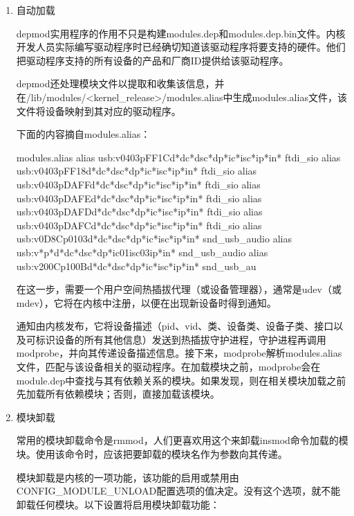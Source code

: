 \documentclass[lang=cn,newtx,10pt,scheme=chinese]{elegantbook}
\begin{document}
\begin{enumerate}
    下面是一个文件中的内容：

    \begin{mycode}{配置文件示例}
        #this line is a comment
        uio
        iwlwifi
    \end{mycode}

    \item 自动加载
    
    depmod实用程序的作用不只是构建modules.dep和modules.dep.bin文件。内核开发人员实际编写驱动程序时已经确切知道该驱动程序将要支持的硬件。他们把驱动程序支持的所有设备的产品和厂商ID提供给该驱动程序。
    
    depmod还处理模块文件以提取和收集该信息，并在/lib/modules/<kernel\_release>/modules.alias中生成modules.alias文件，该文件将设备映射到其对应的驱动程序。

    下面的内容摘自modules.alias：

    \begin{mycode}{modules.alias}
        alias usb:v0403pFF1Cd*dc*dsc*dp*ic*isc*ip*in* ftdi_sio
        alias usb:v0403pFF18d*dc*dsc*dp*ic*isc*ip*in* ftdi_sio
        alias usb:v0403pDAFFd*dc*dsc*dp*ic*isc*ip*in* ftdi_sio
        alias usb:v0403pDAFEd*dc*dsc*dp*ic*isc*ip*in* ftdi_sio
        alias usb:v0403pDAFDd*dc*dsc*dp*ic*isc*ip*in* ftdi_sio
        alias usb:v0403pDAFCd*dc*dsc*dp*ic*isc*ip*in* ftdi_sio
        alias usb:v0D8Cp0103d*dc*dsc*dp*ic*isc*ip*in* snd_usb_audio
        alias usb:v*p*d*dc*dsc*dp*ic01isc03ip*in* snd_usb_audio
        alias usb:v200Cp100Bd*dc*dsc*dp*ic*isc*ip*in* snd_usb_au
    \end{mycode}

    在这一步，需要一个用户空间热插拔代理（或设备管理器），通常是udev（或mdev），它将在内核中注册，以便在出现新设备时得到通知。
    
    通知由内核发布，它将设备描述（pid、vid、类、设备类、设备子类、接口以及可标识设备的所有其他信息）发送到热插拔守护进程，守护进程再调用modprobe，并向其传递设备描述信息。接下来，modprobe解析modules.alias文件，匹配与该设备相关的驱动程序。在加载模块之前，modprobe会在module.dep中查找与其有依赖关系的模块。如果发现，则在相关模块加载之前先加载所有依赖模块；否则，直接加载该模块。

    \item 模块卸载
    
    常用的模块卸载命令是rmmod，人们更喜欢用这个来卸载insmod命令加载的模块。使用该命令时，应该把要卸载的模块名作为参数向其传递。
    
    模块卸载是内核的一项功能，该功能的启用或禁用由CONFIG\_MODULE\_UNLOAD配置选项的值决定。没有这个选项，就不能卸载任何模块。以下设置将启用模块卸载功能：


\end{enumerate}
\end{document}
